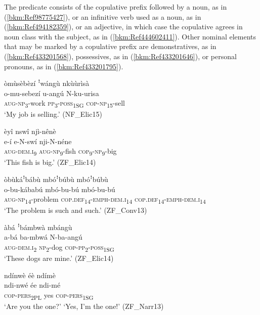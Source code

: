 The predicate consists of the copulative prefix followed by a noun, as in (\ref{bkm:Ref98775427}), or an infinitive verb used as a noun, as in (\ref{bkm:Ref494182359}), or an adjective, in which case the copulative agrees in noun class with the subject, as in (\ref{bkm:Ref444602411}). Other nominal elements that may be marked by a copulative prefix are demonstratives, as in (\ref{bkm:Ref433201568}), possessives, as in (\ref{bkm:Ref433201646}), or personal pronouns, as in (\ref{bkm:Ref433201795}).

\ea
\label{bkm:Ref494182359}
òmùsèbèzí ꜝwángù nkùùrìsà\\
\gll o-mu-sebezí    u-angú  N-ku-urisa\\
\textsc{aug}-\textsc{np}\textsubscript{3}-work  \textsc{pp}\textsubscript{3}-\textsc{poss}\textsubscript{1SG}  \textsc{cop}-\textsc{np}\textsubscript{15}-sell\\
\glt ‘My job is selling.’ (NF\_Elic15)
\z

\ea
\label{bkm:Ref444602411}
èyî nswî njì-nênè\\
\gll e-í    e-N-swí  nji-N-néne\\
\textsc{aug}-\textsc{dem}.\textsc{i}\textsubscript{9}   \textsc{aug}-\textsc{np}\textsubscript{9}-fish  \textsc{cop}\textsubscript{9}-\textsc{np}\textsubscript{9}-big\\
\glt ‘This fish is big.’ (ZF\_Elic14)
\z

\ea
\label{bkm:Ref433201568}
òbùkáꜝbábù mbóꜝbúbù mbóꜝbúbù\\
\gll o-bu-kábabú    mbó-bu-bú      mbó-bu-bú\\
\textsc{aug}-\textsc{np}\textsubscript{14}-problem  \textsc{cop}.\textsc{def}\textsubscript{14}-\textsc{emph}-\textsc{dem}.\textsc{i}\textsubscript{14} \textsc{cop}.\textsc{def}\textsubscript{14}-\textsc{emph}-\textsc{dem}.\textsc{i}\textsubscript{14}\\
\glt ‘The problem is such and such.’ (ZF\_Conv13)
\z

\ea
\label{bkm:Ref433201646}
àbá ꜝbámbwà mbángù\\
\gll a-bá    ba-mbwá  N-ba-angú\\
\textsc{aug}-\textsc{dem}.\textsc{i}\textsubscript{2}  \textsc{np}\textsubscript{2}-dog  \textsc{cop}-\textsc{pp}\textsubscript{2}-\textsc{poss}\textsubscript{1SG}\\
\glt ‘These dogs are mine.’ (ZF\_Elic14)
\z

\ea
\label{bkm:Ref433201795}
ndínwè éè ndímè\\
\gll ndi-nwé  ée  ndi-mé\\
\textsc{cop}-\textsc{pers}\textsubscript{2PL}  yes  \textsc{cop}-\textsc{pers}\textsubscript{1SG}\\
\glt ‘Are you the one?’ ‘Yes, I’m the one!’ (ZF\_Narr13)
\z

